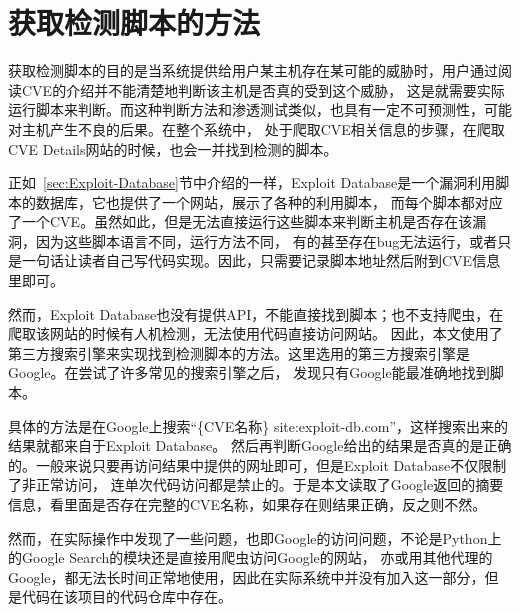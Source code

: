 \section{获取检测脚本的方法}
\label{sec:scripts}

获取检测脚本的目的是当系统提供给用户某主机存在某可能的威胁时，用户通过阅读CVE的介绍并不能清楚地判断该主机是否真的受到这个威胁，
这是就需要实际运行脚本来判断。而这种判断方法和渗透测试类似，也具有一定不可预测性，可能对主机产生不良的后果。在整个系统中，
处于爬取CVE相关信息的步骤，在爬取CVE Details网站的时候，也会一并找到检测的脚本。

正如~\ref{sec:Exploit-Database}节中介绍的一样，Exploit Database是一个漏洞利用脚本的数据库，它也提供了一个网站，展示了各种的利用脚本，
而每个脚本都对应了一个CVE。虽然如此，但是无法直接运行这些脚本来判断主机是否存在该漏洞，因为这些脚本语言不同，运行方法不同，
有的甚至存在bug无法运行，或者只是一句话让读者自己写代码实现。因此，只需要记录脚本地址然后附到CVE信息里即可。

然而，Exploit Database也没有提供API，不能直接找到脚本；也不支持爬虫，在爬取该网站的时候有人机检测，无法使用代码直接访问网站。
因此，本文使用了第三方搜索引擎来实现找到检测脚本的方法。这里选用的第三方搜索引擎是Google。在尝试了许多常见的搜索引擎之后，
发现只有Google能最准确地找到脚本。

具体的方法是在Google上搜索“\{CVE名称\} site:exploit-db.com”，这样搜索出来的结果就都来自于Exploit Database。
然后再判断Google给出的结果是否真的是正确的。一般来说只要再访问结果中提供的网址即可，但是Exploit Database不仅限制了非正常访问，
连单次代码访问都是禁止的。于是本文读取了Google返回的摘要信息，看里面是否存在完整的CVE名称，如果存在则结果正确，反之则不然。

然而，在实际操作中发现了一些问题，也即Google的访问问题，不论是Python上的Google Search的模块还是直接用爬虫访问Google的网站，
亦或用其他代理的Google，都无法长时间正常地使用，因此在实际系统中并没有加入这一部分，但是代码在该项目的代码仓库中存在。
